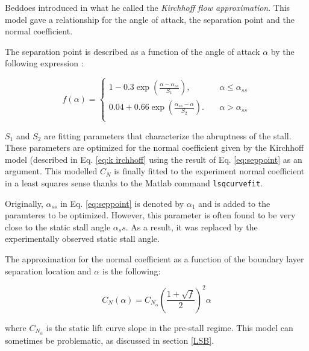 Beddoes introduced in \cite{beddoes_representation_1983} what he called the \textit{Kirchhoff flow approximation}. This model gave a relationship for the angle of attack, the separation point and the normal coefficient.

The separation point is described as a function of the angle of attack $\alpha$ by the following expression : 

\begin{equation}
	f(\alpha) = 
		\begin{cases}
		1-0.3\exp(\frac{\alpha-\alpha_{ss}}{S_1}), &\quad \alpha \leq \alpha_{ss}\\
		0.04+0.66\exp(\frac{\alpha_{ss}-\alpha}{S_2}). &\quad \alpha > \alpha_{ss}\\
		\end{cases}
	\label{eq:seppoint}
\end{equation}

\noindent $S_1$ and $S_2$ are fitting parameters that characterize the abruptness of the stall. These parameters are optimized for the normal coefficient given by the Kirchhoff model (described in Eq. \eqref{eq:k irchhoff} using the result of Eq. \eqref{eq:seppoint} as an argument. This modelled $C_N$ is finally fitted to the experiment normal coefficient in a least squares sense thanks to the Matlab command \texttt{lsqcurvefit}.

Originally, $\alpha_{ss}$ in Eq. \ref{eq:seppoint} is denoted by $\alpha_1$ and is added to the paramteres to be optimized. However, this parameter is often found to be very close to the static stall angle $\alpha_ss$. As a result, it was replaced by the experimentally observed static stall angle. 

The approximation for the normal coefficient as a function of the boundary layer separation location and $\alpha$ is the following: 

\begin{equation}
	C_N (\alpha) = C_ {N_{\alpha}} \left(\frac{1+\sqrt{f}}{2}\right)^2 \alpha
	\label{eq:kirchhoff}
\end{equation}

\noindent where $C_{N_\alpha}$ is the static lift curve slope in the pre-stall regime. This model can sometimes be problematic, as discussed in section \ref{LSB}.

\iffalse
\begin{tikzpicture}[
	nonterminal/.style={
		rectangle,
		minimumsize=6mm,
		very thick,
		draw=black,
		color=white,						
	}]
	\node [nonterminal] {\alpha}
\end{tikzpicture}
\fi

